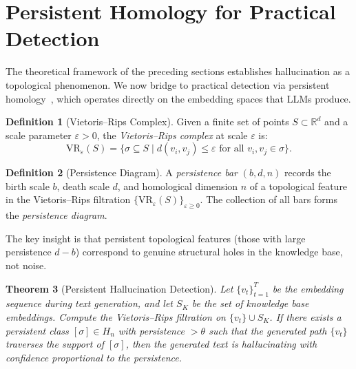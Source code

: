 \documentclass[11pt,a4paper]{article}
\theoremstyle{plain}
\newtheorem{theorem}{Theorem}[section]
\theoremstyle{definition}
\newtheorem{definition}[theorem]{Definition}
\theoremstyle{remark}
\newcommand{\VR}{\mathrm{VR}}
\newcommand{\R}{\mathbb{R}}
\begin{document}
\section{Persistent Homology for Practical Detection}
\label{sec:persistent}

The theoretical framework of the preceding sections establishes hallucination as a topological phenomenon. We now bridge to practical detection via persistent homology~\cite{edelsbrunner2010}, which operates directly on the embedding spaces that LLMs produce.

\begin{definition}[Vietoris--Rips Complex]
\label{def:vietoris-rips}
Given a finite set of points $S \subset \R^d$ and a scale parameter $\varepsilon > 0$, the \emph{Vietoris--Rips complex} at scale $\varepsilon$ is:
\[
\VR_\varepsilon(S) = \{\sigma \subseteq S \mid d(v_i, v_j) \leq \varepsilon \text{ for all } v_i, v_j \in \sigma\}.
\]
\end{definition}

\begin{definition}[Persistence Diagram]
\label{def:persistence}
A \emph{persistence bar} $(b, d, n)$ records the birth scale $b$, death scale $d$, and homological dimension $n$ of a topological feature in the Vietoris--Rips filtration $\{\VR_\varepsilon(S)\}_{\varepsilon \geq 0}$. The collection of all bars forms the \emph{persistence diagram}.
\end{definition}

The key insight is that persistent topological features (those with large persistence $d - b$) correspond to genuine structural holes in the knowledge base, not noise.

\begin{theorem}[Persistent Hallucination Detection]
\label{thm:persistent-detection}
Let $\{v_t\}_{t=1}^T$ be the embedding sequence during text generation, and let $S_K$ be the set of knowledge base embeddings. Compute the Vietoris--Rips filtration on $\{v_t\} \cup S_K$. If there exists a persistent class $[\sigma] \in H_n$ with persistence $> \theta$ such that the generated path $\{v_t\}$ traverses the support of $[\sigma]$, then the generated text is hallucinating with confidence proportional to the persistence.
\end{theorem}
\end{document}
